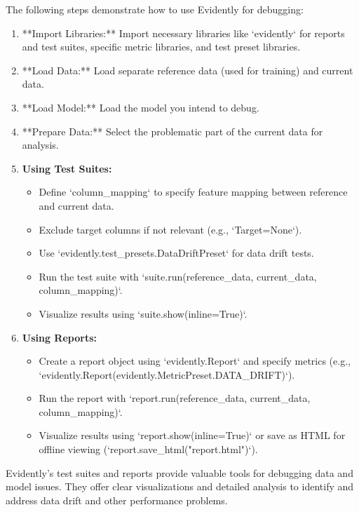 \documentclass[letterpaper,12pt,notitlepage,twoside]{report}
\begin{document}
The following steps demonstrate how to use Evidently for debugging:

\begin{enumerate}
  \item **Import Libraries:** Import necessary libraries like `evidently` for reports and test suites, specific metric libraries, and test preset libraries.

  \item **Load Data:** Load separate reference data (used for training) and current data.

  \item **Load Model:** Load the model you intend to debug.

  \item **Prepare Data:** Select the problematic part of the current data for analysis.

  \item \textbf{Using Test Suites:}
    \begin{itemize}[noitemsep, topsep=0pt]
      \item Define `column\_mapping` to specify feature mapping between reference and current data.
      \item Exclude target columns if not relevant (e.g., `Target=None`).
      \item Use `evidently.test\_presets.DataDriftPreset` for data drift tests.
      \item Run the test suite with `suite.run(reference\_data, current\_data, column\_mapping)`.
      \item Visualize results using `suite.show(inline=True)`.
    \end{itemize}

  \item \textbf{Using Reports:}
    \begin{itemize}[noitemsep, topsep=0pt]
      \item Create a report object using `evidently.Report` and specify metrics (e.g., `evidently.Report(evidently.MetricPreset.DATA\_DRIFT)`).
      \item Run the report with `report.run(reference\_data, current\_data, column\_mapping)`.
      \item Visualize results using `report.show(inline=True)` or save as HTML for offline viewing (`report.save\_html("report.html")`).
    \end{itemize}
\end{enumerate}

Evidently's test suites and reports provide valuable tools for debugging data and model issues. They offer clear visualizations and detailed analysis to identify and address data drift and other performance problems.
\end{document}
